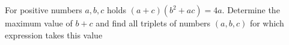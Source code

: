 For positive numbers $a, b, c$ holds $(a + c) (b^2 + a c) = 4a$.
Determine the maximum value of $b + c$ and find all triplets of numbers $(a, b, c)$ for which expression takes this value